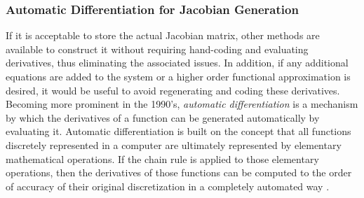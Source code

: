 \subsubsection{Automatic Differentiation for Jacobian Generation}
\label{subsubsec:automatic_differentiation}
If it is acceptable to store the actual Jacobian matrix, other methods
are available to construct it without requiring hand-coding and
evaluating derivatives, thus eliminating the associated issues. In
addition, if any additional equations are added to the system or a
higher order functional approximation is desired, it would be useful
to avoid regenerating and coding these derivatives. Becoming more
prominent in the 1990's, \textit{automatic differentiation} is a
mechanism by which the derivatives of a function can be generated
automatically by evaluating it. Automatic differentiation is built on
the concept that all functions discretely represented in a computer
are ultimately represented by elementary mathematical operations. If
the chain rule is applied to those elementary operations, then the
derivatives of those functions can be computed to the order of
accuracy of their original discretization in a completely automated
way \citep{averick_computing_1994}.

